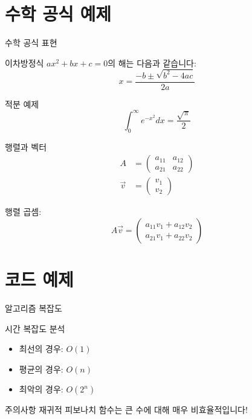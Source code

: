\documentclass[aspectratio=169]{beamer}
\begin{document}
\section{수학 공식 예제}

\begin{frame}{수학 공식 표현}
    \begin{block}{이차방정식}
        $ax^2 + bx + c = 0$의 해는 다음과 같습니다:
        \[x = \frac{-b \pm \sqrt{b^2 - 4ac}}{2a}\]
    \end{block}
    
    \pause
    
    \begin{block}{적분 예제}
        \[\int_{0}^{\infty} e^{-x^2} dx = \frac{\sqrt{\pi}}{2}\]
    \end{block}
\end{frame}

\begin{frame}{행렬과 벡터}
    \begin{align}
        A &= \begin{pmatrix}
            a_{11} & a_{12} \\
            a_{21} & a_{22}
        \end{pmatrix} \\
        \vec{v} &= \begin{pmatrix}
            v_1 \\
            v_2
        \end{pmatrix}
    \end{align}
    
    \pause
    
    행렬 곱셈:
    \[A\vec{v} = \begin{pmatrix}
        a_{11}v_1 + a_{12}v_2 \\
        a_{21}v_1 + a_{22}v_2
    \end{pmatrix}\]
\end{frame}

\section{코드 예제}

\begin{frame}[fragile]{알고리즘 복잡도}
    \begin{block}{시간 복잡도 분석}
        \begin{itemize}
            \item 최선의 경우: $O(1)$
            \item 평균의 경우: $O(n)$
            \item 최악의 경우: $O(2^n)$
        \end{itemize}
    \end{block}
    
    \pause
    
    \begin{alertblock}{주의사항}
        재귀적 피보나치 함수는 큰 수에 대해 매우 비효율적입니다!
    \end{alertblock}
\end{frame}
\end{document}
